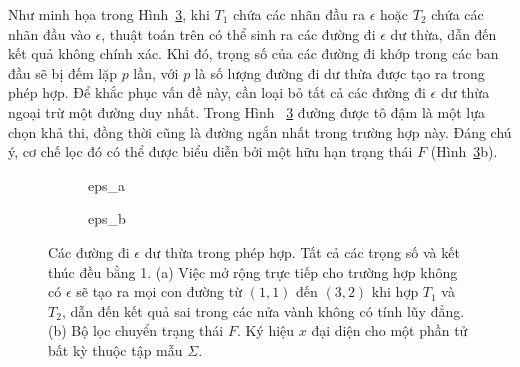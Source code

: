 Như minh họa trong Hình~\ref{fig:epsilon-filter-composition},
khi $T_1$ chứa các nhãn đầu ra $\epsilon$
hoặc $T_2$ chứa các nhãn đầu vào $\epsilon$,
thuật toán trên có thể sinh ra
các đường đi $\epsilon$ dư thừa,
dẫn đến kết quả không chính xác.
Khi đó,
trọng số của các đường đi khớp
trong các  ban đầu
sẽ bị đếm lặp $p$ lần,
với $p$
là số lượng đường đi dư thừa
được tạo ra trong phép hợp.
Để khắc phục vấn đề này,
cần loại bỏ tất cả các đường đi $\epsilon$
dư thừa ngoại trừ một đường duy nhất. Trong Hình ~\ref{fig:epsilon-filter-composition}
đường được tô đậm là một lựa chọn khả thi,
đồng thời cũng là đường ngắn nhất
trong trường hợp này. Đáng chú ý,
cơ chế lọc đó có thể được biểu diễn
bởi một  hữu hạn trạng thái $F$ (Hình~\ref{fig:epsilon-filter-composition}b).


\begin{figure}[htbp]
  \centering
  \begin{subfigure}[T]{0.49\textwidth}
    \centering
    {eps_a}
    \label{fig:eps_a}
  \end{subfigure}
  \hfill
  \begin{subfigure}[T]{0.49\textwidth}
    \centering
    {eps_b}
    \label{fig:eps_b}
  \end{subfigure}
  \caption[Đường đi $\epsilon$ dư thừa và Bộ lọc $F$]{
    Các đường đi $\epsilon$ dư thừa trong phép hợp. Tất cả các trọng số  và kết thúc đều bằng 1. 
    (a) Việc mở rộng trực tiếp cho trường hợp không có $\epsilon$ sẽ tạo ra mọi con đường từ $(1,1)$ đến $(3,2)$ khi hợp $T_1$ và $T_2$, dẫn đến kết quả sai trong các nửa vành không có tính lũy đẳng. 
    (b) Bộ lọc chuyển trạng thái $F$. Ký hiệu $x$ đại diện cho một phần tử bất kỳ thuộc tập mẫu $\Sigma$.
  }
  \label{fig:epsilon-filter-composition}
\end{figure}

